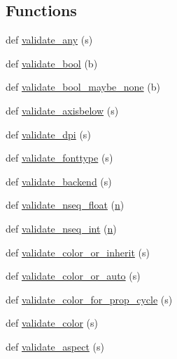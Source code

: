 \subsection*{Functions}
\begin{DoxyCompactItemize}
\item 
def \hyperlink{namespacematplotlib_1_1rcsetup_a2690931d36c48630e7d2cb03da5aed60}{validate\+\_\+any} (s)
\item 
def \hyperlink{namespacematplotlib_1_1rcsetup_a744450290347bdb35385f369da71fbb3}{validate\+\_\+bool} (b)
\item 
def \hyperlink{namespacematplotlib_1_1rcsetup_a46bee4d48127d3f6ed35217f7182e9ab}{validate\+\_\+bool\+\_\+maybe\+\_\+none} (b)
\item 
def \hyperlink{namespacematplotlib_1_1rcsetup_a9886107b8c738a8aa751770eb84004b3}{validate\+\_\+axisbelow} (s)
\item 
def \hyperlink{namespacematplotlib_1_1rcsetup_adc9339aa98da572a1ddc55f587b77da1}{validate\+\_\+dpi} (s)
\item 
def \hyperlink{namespacematplotlib_1_1rcsetup_a7c2311a5cd2e610fb848c26e97b1b1f1}{validate\+\_\+fonttype} (s)
\item 
def \hyperlink{namespacematplotlib_1_1rcsetup_aff6ec0abbfb3ac53bf8866743eaf4c0c}{validate\+\_\+backend} (s)
\item 
def \hyperlink{namespacematplotlib_1_1rcsetup_a0f4e77e2ceb4ce318b11f4ece24cb6e7}{validate\+\_\+nseq\+\_\+float} (\hyperlink{namespacematplotlib_1_1rcsetup_acce693f276e6fb23ae89de2f5d01edfe}{n})
\item 
def \hyperlink{namespacematplotlib_1_1rcsetup_accc04ab82822a119570bdf84f4ffd5c7}{validate\+\_\+nseq\+\_\+int} (\hyperlink{namespacematplotlib_1_1rcsetup_acce693f276e6fb23ae89de2f5d01edfe}{n})
\item 
def \hyperlink{namespacematplotlib_1_1rcsetup_a1b04d41602543d456c3f286028383d65}{validate\+\_\+color\+\_\+or\+\_\+inherit} (s)
\item 
def \hyperlink{namespacematplotlib_1_1rcsetup_a72f3807028e119e761af28eb20a0e504}{validate\+\_\+color\+\_\+or\+\_\+auto} (s)
\item 
def \hyperlink{namespacematplotlib_1_1rcsetup_aeaef8a524ab1bf628541d7ddef3de7cc}{validate\+\_\+color\+\_\+for\+\_\+prop\+\_\+cycle} (s)
\item 
def \hyperlink{namespacematplotlib_1_1rcsetup_a93399aefead5ade9d807360e53cd83c5}{validate\+\_\+color} (s)
\item 
def \hyperlink{namespacematplotlib_1_1rcsetup_a9fe1d77998ca1217399fc110de32051c}{validate\+\_\+aspect} (s)

\end{DoxyCompactItemize}
